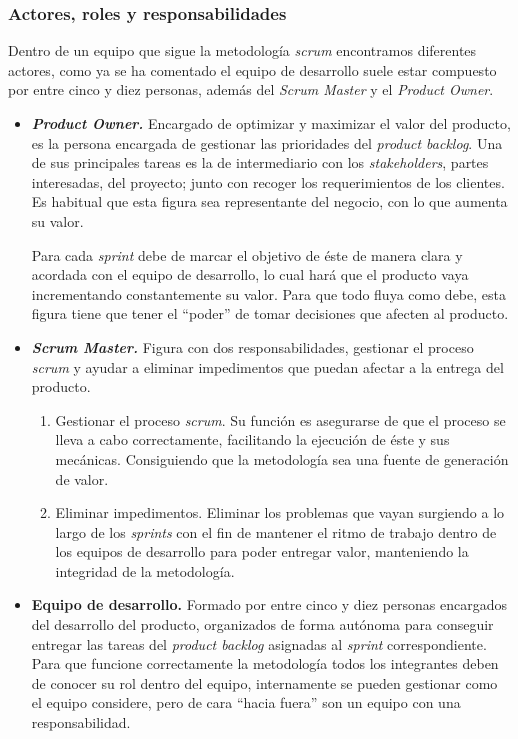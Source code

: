 \subsubsection{Actores, roles y responsabilidades}
Dentro de un equipo que sigue la metodología \textit{scrum} encontramos diferentes actores, como ya se ha comentado el equipo de desarrollo suele estar compuesto por entre cinco y diez personas, además del \textit{Scrum Master} y el \textit{Product Owner}.\cite{julioroche_2020}
\begin{itemize}
\item \textbf{\textit{Product Owner.}} Encargado de optimizar y maximizar el valor del producto, es la persona encargada de gestionar las prioridades del \textit{product backlog}. Una de sus principales tareas es la de intermediario con los \textit{stakeholders}, partes interesadas, del proyecto; junto con recoger los requerimientos de los clientes. Es habitual que esta figura sea representante del negocio, con lo que aumenta su valor.

Para cada \textit{sprint} debe de marcar el objetivo de éste de manera clara y acordada con el equipo de desarrollo, lo cual hará que el producto vaya incrementando constantemente su valor. Para que todo fluya como debe, esta figura tiene que tener el ``poder'' de tomar decisiones que afecten al producto.

\item \textbf{\textit{Scrum Master.}} Figura con dos responsabilidades, gestionar el proceso \textit{scrum} y ayudar a eliminar impedimentos que puedan afectar a la entrega del producto.
\begin{enumerate}
\item Gestionar el proceso \textit{scrum}. Su función es asegurarse de que el proceso se lleva a cabo correctamente, facilitando la ejecución de éste y sus mecánicas. Consiguiendo que la metodología sea una fuente de generación de valor.
\item Eliminar impedimentos. Eliminar los problemas que vayan surgiendo a lo largo de los \textit{sprints} con el fin de mantener el ritmo de trabajo dentro de los equipos de desarrollo para poder entregar valor, manteniendo la integridad de la metodología.
\end{enumerate}
\item \textbf{Equipo de desarrollo.} Formado por entre cinco y diez personas encargados del desarrollo del producto, organizados de forma autónoma para conseguir entregar las tareas del \textit{product backlog} asignadas al \textit{sprint} correspondiente. Para que funcione correctamente la metodología todos los integrantes deben de conocer su rol dentro del equipo, internamente se pueden gestionar como el equipo considere, pero de cara ``hacia fuera'' son un equipo con una responsabilidad.
\end{itemize}
\newpage

